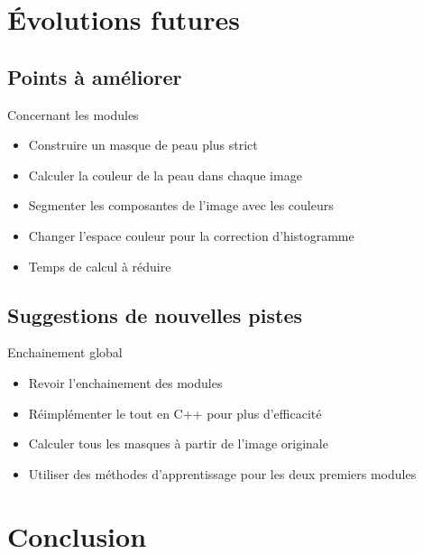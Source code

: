 \documentclass{beamer}
\begin{document}
\section{Évolutions futures}

\subsection{Points à améliorer}

\begin{frame}{Concernant les modules}
\begin{itemize}
\item Construire un masque de peau plus strict
\item Calculer la couleur de la peau dans chaque image
\item Segmenter les composantes de l'image avec les couleurs
\item Changer l'espace couleur pour la correction d'histogramme
\item Temps de calcul à réduire
\end{itemize}
\end{frame}

\subsection{Suggestions de nouvelles pistes}

\begin{frame}{Enchainement global}
\begin{itemize}
\item Revoir l'enchainement des modules
\item Réimplémenter le tout en C++ pour plus d'efficacité
\item Calculer tous les masques à partir de l'image originale
\item Utiliser des méthodes d'apprentissage pour les deux premiers modules
\end{itemize}
\end{frame}

\section{Conclusion}
\end{document}
